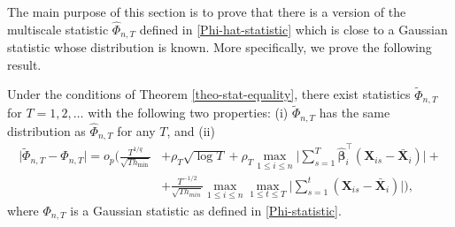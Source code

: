 The main purpose of this section is to prove that there is a version of the multiscale statistic $\widehat{\Phi}_{n,T}$ defined in \eqref{Phi-hat-statistic} which is close to a Gaussian statistic whose distribution is known. More specifically, we prove the following result. 
\begin{propA}\label{propA-strong-approx-equality}
Under the conditions of Theorem \ref{theo-stat-equality}, there exist statistics $\widetilde{\Phi}_{n,T}$ for $T = 1,2,\ldots$ with the following two properties: (i) $\widetilde{\Phi}_{n, T}$ has the same distribution as $\widehat{\Phi}_{n, T}$ for any $T$, and (ii)
\begin{align*}
\big| \widetilde{\Phi}_{n, T} - \Phi_{n,T} \big| = o_p \Big( \frac{T^{1/q}}{\sqrt{T h_{\min}}} &+ \rho_T \sqrt{\log T} + \rho_T\max_{1\le i\le n} \Big|\sum\limits_{s=1}^T \widehat{\bm{\beta}}_i^\top(\mathbf{X}_{is} - \bar{\mathbf{X}}_{i} )\Big| +\\
&+ \frac{T^{-1/2}}{\sqrt{Th_{min}}} \max_{1 \le i \le n}\max_{1\le t \le T}\Big|\sum\limits_{s=1}^t (\mathbf{X}_{is} - \bar{\mathbf{X}}_{i} )\Big|  \Big),
\end{align*}
where $\Phi_{n,T}$ is a Gaussian statistic as defined in \eqref{Phi-statistic}. 
\end{propA}

